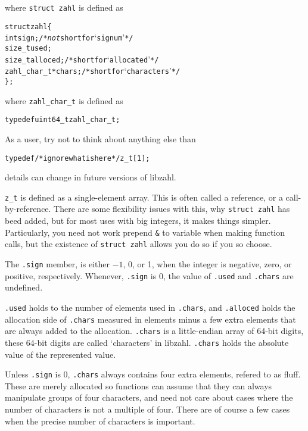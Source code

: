 \noindent
where {\tt struct zahl} is defined as

\begin{alltt}
   struct zahl \{
       int sign;            \textcolor{c}{/* \textrm{\emph{not} short for `signum'} */}
       size_t used;
       size_t alloced;      \textcolor{c}{/* \textrm{short for `allocated'} */}
       zahl_char_t *chars;  \textcolor{c}{/* \textrm{short for `characters'} */}
   \};
\end{alltt}

\noindent
where {\tt zahl\_char\_t} is defined as

\begin{alltt}
   typedef uint64_t zahl_char_t;
\end{alltt}

\noindent
As a user, try not to think about anything else than

\begin{alltt}
   typedef \textcolor{c}{/* \textrm{ignore what is here} */} z_t[1];
\end{alltt}

\noindent
details can change in future versions of libzahl.

{\tt z\_t} is defined as a single-element array. This
is often called a reference, or a call-by-reference.
There are some flexibility issues with this, why
{\tt struct zahl} has beed added, but for most uses
with big integers, it makes things simpler. Particularly,
you need not work prepend {\tt \&} to variable when making
function calls, but the existence of {\tt struct zahl}
allows you do so if you so choose.

The {\tt .sign} member, is either $-1$, 0, or 1,
when the integer is negative, zero, or positive,
respectively. Whenever, {\tt .sign} is 0, the value
of {\tt .used} and {\tt .chars} are undefined.

{\tt .used} holds to the number of elements used in
{\tt .chars}, and {\tt .alloced} holds the allocation
side of {\tt .chars} measured in elements minus a few
extra elements that are always added to the allocation.
{\tt .chars} is a little-endian array of 64-bit digits,
these 64-bit digits are called `characters' in libzahl.
{\tt .chars} holds the absolute value of the
represented value.

Unless {\tt .sign} is 0, {\tt .chars} always contains
four extra elements, refered to as fluff. These are
merely allocated so functions can assume that they can
always manipulate groups of four characters, and need
not care about cases where the number of characters is
not a multiple of four. There are of course a few cases
when the precise number of characters is important.



